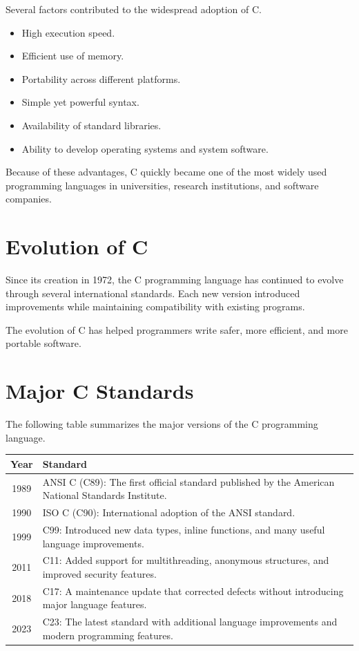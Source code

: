 \documentclass[12pt,openany]{book}
\begin{document}
Several factors contributed to the widespread adoption of C.

\begin{itemize}
    \item High execution speed.
    \item Efficient use of memory.
    \item Portability across different platforms.
    \item Simple yet powerful syntax.
    \item Availability of standard libraries.
    \item Ability to develop operating systems and system software.
\end{itemize}

Because of these advantages, C quickly became one of the most widely used programming languages in universities, research institutions, and software companies.
\section{Evolution of C}

Since its creation in 1972, the C programming language has continued to evolve through several international standards. Each new version introduced improvements while maintaining compatibility with existing programs.

The evolution of C has helped programmers write safer, more efficient, and more portable software.

\section{Major C Standards}

The following table summarizes the major versions of the C programming language.

\begin{center}
\begin{tabular}{|c|p{9cm}|}
\hline
\textbf{Year} & \textbf{Standard} \\
\hline
1989 & ANSI C (C89): The first official standard published by the American National Standards Institute. \\
\hline
1990 & ISO C (C90): International adoption of the ANSI standard. \\
\hline
1999 & C99: Introduced new data types, inline functions, and many useful language improvements. \\
\hline
2011 & C11: Added support for multithreading, anonymous structures, and improved security features. \\
\hline
2018 & C17: A maintenance update that corrected defects without introducing major language features. \\
\hline
2023 & C23: The latest standard with additional language improvements and modern programming features. \\
\hline
\end{tabular}
\end{center}
\end{document}
